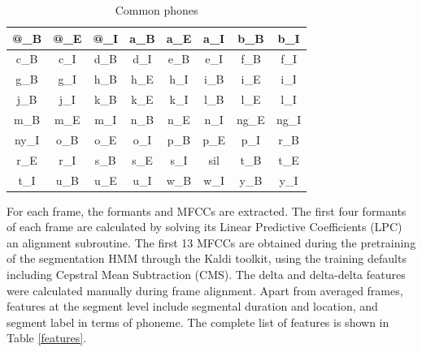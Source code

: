 \documentclass[conference]{IEEEtran}
\begin{document}
\begin{table}[!htb]
\renewcommand{\arraystretch}{1.3}
\caption{Common phones}
\label{phones}
\centering
\begin{tabular}{|c|c|c|c|c|c|c|c|}
    \hline
    @\_B & @\_E & @\_I & a\_B & a\_E & a\_I & b\_B & b\_I\\
    \hline
    c\_B & c\_I & d\_B & d\_I & e\_B & e\_I & f\_B & f\_I\\
    \hline
    g\_B & g\_I & h\_B & h\_E & h\_I & i\_B & i\_E & i\_I\\
    \hline
    j\_B & j\_I & k\_B & k\_E & k\_I & l\_B & l\_E & l\_I\\
    \hline
    m\_B & m\_E & m\_I & n\_B & n\_E & n\_I & ng\_E & ng\_I\\
    \hline
    ny\_I & o\_B & o\_E & o\_I & p\_B & p\_E & p\_I & r\_B\\
    \hline
    r\_E & r\_I & s\_B & s\_E & s\_I & sil & t\_B & t\_E\\
    \hline
    t\_I & u\_B & u\_E & u\_I & w\_B & w\_I & y\_B & y\_I\\
    \hline
\end{tabular}
\end{table}

For each frame, the formants and MFCCs are extracted.
The first four formants of each frame are calculated by solving its Linear Predictive Coefficients (LPC) an alignment subroutine.
The first 13 MFCCs are obtained during the pretraining of the segmentation HMM through the Kaldi toolkit, using the training defaults including Cepstral Mean Subtraction (CMS).
The delta and delta-delta features were calculated manually during frame alignment.
Apart from averaged frames, features at the segment level include segmental duration and location, and segment label in terms of phoneme.
The complete list of features is shown in Table \ref{features}.
\end{document}
